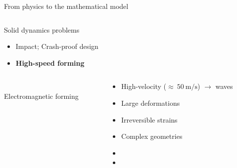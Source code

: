 \begin{withoutheadline}
  \begin{frame}{From physics to the mathematical model}
  \vspace{-0.6cm}
  \begin{overprint}
    
    \begin{columns}
      \begin{column}{0.45\textwidth}
        \begin{block}{Solid dynamics problems}
          \begin{itemize}
          \item[] Impact; Crash-proof design
          \item[] \textbf{High-speed forming}
          \end{itemize}
        \end{block}
      \end{column}
      
      \begin{column}{0.55\textwidth}
      \end{column}
    \end{columns}

    
    \begin{columns}
      \begin{column}{0.45\textwidth}
        \centering
        \\
    \scriptsize Electromagnetic forming \cite{Guillaume}
      \end{column}
      \begin{column}{0.45\textwidth}
        \begin{block}{}
          \begin{footnotesize}
            \begin{itemize}
            \item High-velocity ($\approx \: 50\:\text{m/s}$) $\rightarrow$ waves
            \item Large deformations
            \item Irreversible strains
            \item Complex geometries
            \item[]
            \item[]
            \end{itemize}
          \end{footnotesize}
        \end{block}  
      \end{column}
    \end{columns}
    

\end{overprint}
\end{frame}
\end{withoutheadline}
